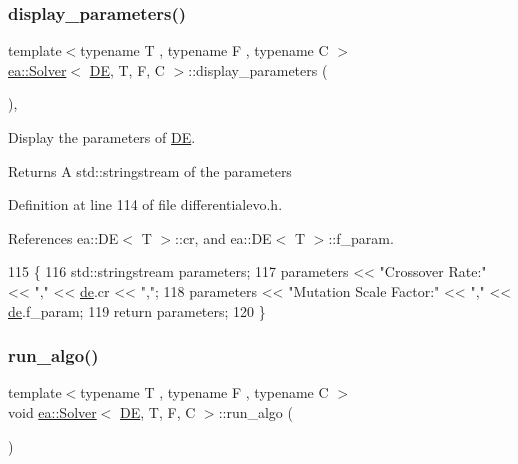 \subsubsection{\texorpdfstring{display\+\_\+parameters()}{display\_parameters()}}
{\footnotesize\ttfamily template$<$typename T , typename F , typename C $>$ \\
\hyperlink{classea_1_1_solver}{ea\+::\+Solver}$<$ \hyperlink{structea_1_1_d_e}{DE}, T, F, C $>$\+::display\+\_\+parameters (\begin{DoxyParamCaption}{ }\end{DoxyParamCaption})\hspace{0.3cm}{\ttfamily [inline]}, {\ttfamily [private]}}



Display the parameters of \hyperlink{structea_1_1_d_e}{DE}. 

\begin{DoxyReturn}{Returns}
A std\+::stringstream of the parameters 
\end{DoxyReturn}


Definition at line 114 of file differentialevo.\+h.



References ea\+::\+D\+E$<$ T $>$\+::cr, and ea\+::\+D\+E$<$ T $>$\+::f\+\_\+param.


\begin{DoxyCode}
115         \{
116             std::stringstream parameters;
117             parameters << \textcolor{stringliteral}{"Crossover Rate:"} << \textcolor{stringliteral}{","} << \hyperlink{classea_1_1_solver_3_01_d_e_00_01_t_00_01_f_00_01_c_01_4_a789b8665ce321248e3999907c37d0963}{de}.cr << \textcolor{stringliteral}{","};
118             parameters << \textcolor{stringliteral}{"Mutation Scale Factor:"} << \textcolor{stringliteral}{","} << \hyperlink{classea_1_1_solver_3_01_d_e_00_01_t_00_01_f_00_01_c_01_4_a789b8665ce321248e3999907c37d0963}{de}.f\_param;
119             \textcolor{keywordflow}{return} parameters;
120         \}
\end{DoxyCode}
\mbox{\label{classea_1_1_solver_3_01_d_e_00_01_t_00_01_f_00_01_c_01_4_a6e560e4d8fb8f578ebe0fd7beb802632}} 
\subsubsection{\texorpdfstring{run\+\_\+algo()}{run\_algo()}}
{\footnotesize\ttfamily template$<$typename T , typename F , typename C $>$ \\
void \hyperlink{classea_1_1_solver}{ea\+::\+Solver}$<$ \hyperlink{structea_1_1_d_e}{DE}, T, F, C $>$\+::run\+\_\+algo (\begin{DoxyParamCaption}{ }\end{DoxyParamCaption})\hspace{0.3cm}{\ttfamily [private]}}



